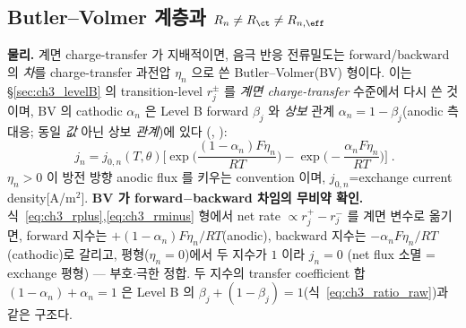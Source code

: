 \subsection{Butler--Volmer 계층과 $R_n\ne R_\ct\ne R_{n,\eff}$}\label{sec:ch3_bv}
\textbf{물리.} 계면 charge-transfer 가 지배적이면, 음극 반응 전류밀도는 forward/backward 의 \emph{차}를
charge-transfer 과전압 $\eta_n$ 으로 쓴 Butler--Volmer(BV) 형이다. 이는 \S\ref{sec:ch3_levelB} 의 transition-level
$r_j^\pm$ 를 \emph{계면 charge-transfer} 수준에서 다시 쓴 것이며, BV 의 cathodic $\alpha_n$ 은 Level B forward
$\beta_j$ 와 \emph{상보} 관계 $\alpha_n=1-\beta_j$(anodic 측 대응; 동일 \emph{값} 아닌 상보 \emph{관계})에 있다
(\cite{bardfaulkner,newman}, ):
\begin{equation}
\boxed{\;j_n=j_{0,n}(T,\theta)\Big[\exp\!\Big(\frac{(1-\alpha_n)F\eta_n}{RT}\Big)-\exp\!\Big(-\frac{\alpha_n F\eta_n}{RT}\Big)\Big]\;.}
\label{eq:ch3_bv}
\end{equation}
$\eta_n>0$ 이 방전 방향 anodic flux 를 키우는 convention 이며, $j_{0,n}$=exchange current density[A/m$^2$].
\textbf{BV 가 forward$-$backward 차임의 무비약 확인.} 식~\eqref{eq:ch3_rplus},\allowbreak\eqref{eq:ch3_rminus} 형에서
net rate $\propto r_j^+-r_j^-$ 를 계면 변수로 옮기면, forward 지수는 $+(1-\alpha_n)F\eta_n/RT$(anodic),
backward 지수는 $-\alpha_n F\eta_n/RT$(cathodic)로 갈리고, 평형($\eta_n=0$)에서 두 지수가 $1$ 이라 $j_n=0$
(net flux 소멸 = exchange 평형) — 부호$\cdot$극한 정합. 두 지수의 transfer coefficient 합 $(1-\alpha_n)+\alpha_n=1$
은 Level B 의 $\beta_j+(1-\beta_j)=1$(식~\eqref{eq:ch3_ratio_raw})과 같은 구조다.

